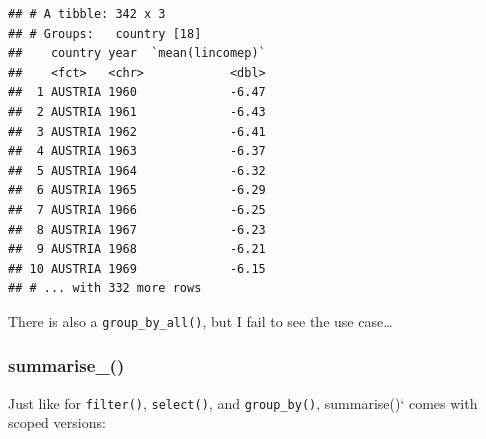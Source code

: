 \documentclass[]{gitbook}
\newenvironment{Shaded}{\begin{snugshade}}{\end{snugshade}}
\newcommand{\DecValTok}[1]{\textcolor[rgb]{0.00,0.00,0.81}{#1}}
\newcommand{\KeywordTok}[1]{\textcolor[rgb]{0.13,0.29,0.53}{\textbf{#1}}}
\newcommand{\NormalTok}[1]{#1}
\newcommand{\OperatorTok}[1]{\textcolor[rgb]{0.81,0.36,0.00}{\textbf{#1}}}
\newcommand{\StringTok}[1]{\textcolor[rgb]{0.31,0.60,0.02}{#1}}
\begin{document}
\begin{Shaded}
\end{Shaded}

\begin{verbatim}
## # A tibble: 342 x 3
## # Groups:   country [18]
##    country year  `mean(lincomep)`
##    <fct>   <chr>            <dbl>
##  1 AUSTRIA 1960             -6.47
##  2 AUSTRIA 1961             -6.43
##  3 AUSTRIA 1962             -6.41
##  4 AUSTRIA 1963             -6.37
##  5 AUSTRIA 1964             -6.32
##  6 AUSTRIA 1965             -6.29
##  7 AUSTRIA 1966             -6.25
##  8 AUSTRIA 1967             -6.23
##  9 AUSTRIA 1968             -6.21
## 10 AUSTRIA 1969             -6.15
## # ... with 332 more rows
\end{verbatim}

There is also a \texttt{group\_by\_all()}, but I fail to see the use case\ldots{}

\hypertarget{summarise_}{%
\subsubsection{summarise\_()}\label{summarise_}}

Just like for \texttt{filter()}, \texttt{select()}, and \texttt{group\_by()}, summarise()` comes with scoped versions:

\begin{Shaded}
\end{Shaded}
\end{document}
